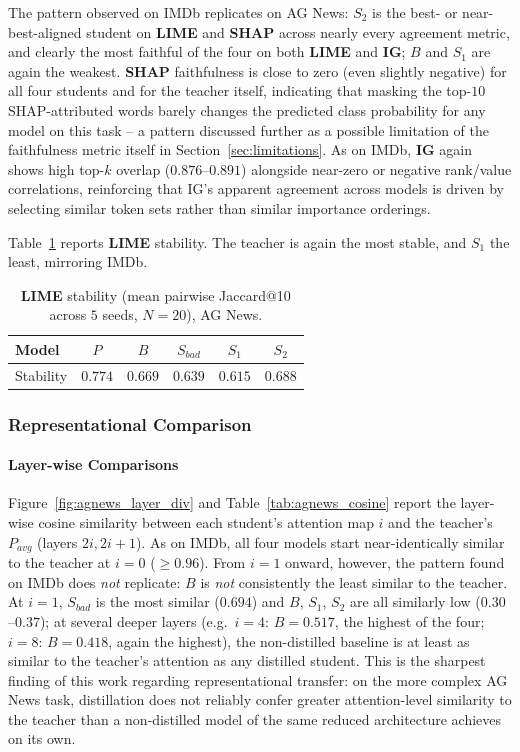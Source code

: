 \documentclass[conference]{IEEEtran}
\begin{document}
The pattern observed on IMDb replicates on AG News: $S_2$ is the best- or near-best-aligned student on \textbf{LIME} and \textbf{SHAP} across nearly every agreement metric, and clearly the most faithful of the four on both \textbf{LIME} and \textbf{IG}; $B$ and $S_1$ are again the weakest. \textbf{SHAP} faithfulness is close to zero (even slightly negative) for all four students and for the teacher itself, indicating that masking the top-$10$ SHAP-attributed words barely changes the predicted class probability for any model on this task -- a pattern discussed further as a possible limitation of the faithfulness metric itself in Section~\ref{sec:limitations}. As on IMDb, \textbf{IG} again shows high top-$k$ overlap ($0.876$--$0.891$) alongside near-zero or negative rank/value correlations, reinforcing that IG's apparent agreement across models is driven by selecting similar token sets rather than similar importance orderings.

Table~\ref{tab:agnews_stability} reports \textbf{LIME} stability. The teacher is again the most stable, and $S_1$ the least, mirroring IMDb.

\begin{table}[h!]
\centering
\caption{\textbf{LIME} stability (mean pairwise Jaccard@10 across $5$ seeds, $N=20$), AG News.}
\begin{tabular}{|l|c|c|c|c|c|}
\hline
Model & $P$ & $B$ & $S_{bad}$ & $S_1$ & $S_2$ \\ \hline
Stability & $0.774$ & $0.669$ & $0.639$ & $0.615$ & $0.688$ \\ \hline
\end{tabular}
\label{tab:agnews_stability}
\end{table}

\subsubsection{Representational Comparison}\label{sec:agnews-repr}

\paragraph{Layer-wise Comparisons}

Figure~\ref{fig:agnews_layer_div} and Table~\ref{tab:agnews_cosine} report the layer-wise cosine similarity between each student's attention map $i$ and the teacher's $P_{avg}$ (layers $2i,2i+1$). As on IMDb, all four models start near-identically similar to the teacher at $i=0$ ($\ge0.96$). From $i=1$ onward, however, the pattern found on IMDb does \emph{not} replicate: $B$ is \emph{not} consistently the least similar to the teacher. At $i=1$, $S_{bad}$ is the most similar ($0.694$) and $B$, $S_1$, $S_2$ are all similarly low ($0.30$--$0.37$); at several deeper layers (e.g.\ $i=4$: $B=0.517$, the highest of the four; $i=8$: $B=0.418$, again the highest), the non-distilled baseline is at least as similar to the teacher's attention as any distilled student. This is the sharpest finding of this work regarding representational transfer: on the more complex AG News task, distillation does not reliably confer greater attention-level similarity to the teacher than a non-distilled model of the same reduced architecture achieves on its own.
\end{document}
